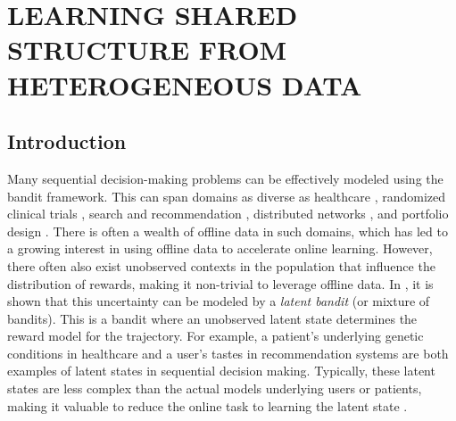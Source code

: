 \chapter{LEARNING SHARED STRUCTURE FROM HETEROGENEOUS DATA}
\label{ch:latent-bandits}


\section{Introduction}

Many sequential decision-making problems can be effectively modeled using the bandit framework. This can span domains as diverse as healthcare \citep{lu2021bandit}, randomized clinical trials \citep{press2009rct}, search and recommendation \citep{Li_2010}, distributed networks \citep{kar2011banditnetworks}, and portfolio design \citep{brochu2011portfolio}. There is often a wealth of offline data in such domains, which has led to a growing interest in using offline data to accelerate online learning. However, there often also exist unobserved contexts in the population that influence the distribution of rewards, making it non-trivial to leverage offline data. In \citet{hong2020latent}, it is shown that this uncertainty can be modeled by a \textit{latent bandit} (or mixture of bandits). This is a bandit where an unobserved latent state determines the reward model for the trajectory. For example, a patient's underlying genetic conditions in healthcare and a user's tastes in recommendation systems are both examples of latent states in sequential decision making. Typically, these latent states are less complex than the actual models underlying users or patients, making it valuable to reduce the online task to learning the latent state \citep{hong2020latent, hong2022thompsonsamplingmixtureprior}.

